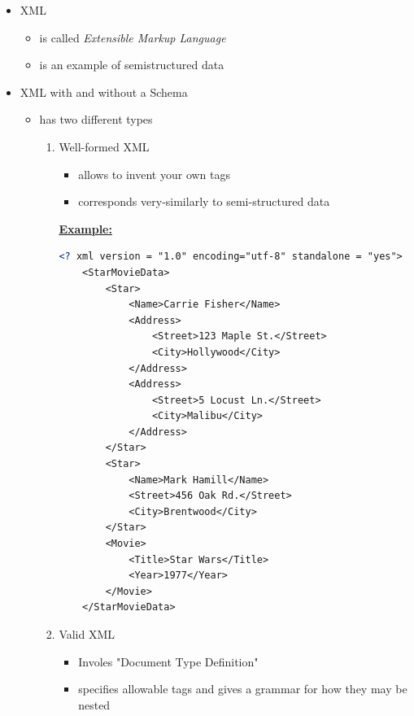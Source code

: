 \documentclass[12pt]{article}
\begin{document}
\begin{enumerate}[1.]
    \begin{itemize}
        \item XML
        \begin{itemize}
            \item is called \textit{Extensible Markup Language}
            \item is an example of semistructured data
        \end{itemize}
        \item XML with and without a Schema
        \begin{itemize}
            \item has two different types
            \begin{enumerate}[1.]
                \item Well-formed XML
                \begin{itemize}
                    \item allows to invent your own tags
                    \item corresponds very-similarly to semi-structured data
                \end{itemize}

                \bigskip

                \underline{\textbf{Example:}}

                \bigskip

    \begin{lstlisting}[language=XML]
    <? xml version = "1.0" encoding="utf-8" standalone = "yes">
    <StarMovieData>
        <Star>
            <Name>Carrie Fisher</Name>
            <Address>
                <Street>123 Maple St.</Street>
                <City>Hollywood</City>
            </Address>
            <Address>
                <Street>5 Locust Ln.</Street>
                <City>Malibu</City>
            </Address>
        </Star>
        <Star>
            <Name>Mark Hamill</Name>
            <Street>456 Oak Rd.</Street>
            <City>Brentwood</City>
        </Star>
        <Movie>
            <Title>Star Wars</Title>
            <Year>1977</Year>
        </Movie>
    </StarMovieData>
    \end{lstlisting}
                \item Valid XML

                \begin{itemize}
                    \item Involes "Document Type Definition"
                    \item specifies allowable tags and gives a grammar for how they may be nested
                \end{itemize}
            \end{enumerate}
        \end{itemize}
    \end{itemize}

\end{enumerate}
\end{document}
